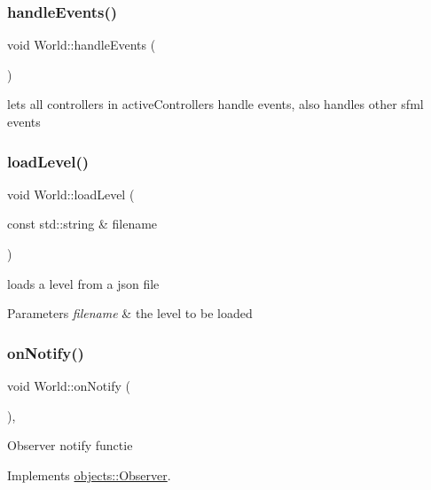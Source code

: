 \subsubsection{\texorpdfstring{handle\+Events()}{handleEvents()}}
{\footnotesize\ttfamily void World\+::handle\+Events (\begin{DoxyParamCaption}{ }\end{DoxyParamCaption})}

lets all controllers in active\+Controllers handle events, also handles other sfml events \mbox{\label{classWorld_a6a08c827c3a0def12b7700211353735f}} 
\subsubsection{\texorpdfstring{load\+Level()}{loadLevel()}}
{\footnotesize\ttfamily void World\+::load\+Level (\begin{DoxyParamCaption}\item[{const std\+::string \&}]{filename }\end{DoxyParamCaption})}

loads a level from a json file 
\begin{DoxyParams}{Parameters}
{\em filename} & the level to be loaded \\
\hline
\end{DoxyParams}
\mbox{\label{classWorld_a91c2d7b127190f17a6cd85743245fb5b}} 
\subsubsection{\texorpdfstring{on\+Notify()}{onNotify()}}
{\footnotesize\ttfamily void World\+::on\+Notify (\begin{DoxyParamCaption}{ }\end{DoxyParamCaption})\hspace{0.3cm}{\ttfamily [override]}, {\ttfamily [virtual]}}

Observer notify functie 

Implements \hyperlink{classobjects_1_1Observer_a08db257ca01702390b6e39b68a0dfea5}{objects\+::\+Observer}.

\mbox{\label{classWorld_a5cc73b1aa54db5da01e4004acd4fd8bb}} 
